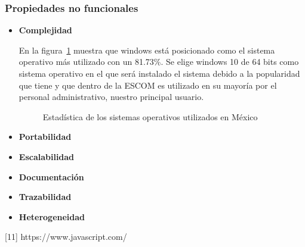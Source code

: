 	\subsubsection{Propiedades no funcionales}
		\begin{itemize}
			\item \textbf{Complejidad}
			
				En la figura~\ref{fig:vistalogica} muestra que windows está posicionado como el sistema operativo más utilizado con un 81.73\%. Se elige windows 10 de 64 bits como sistema operativo en el que será instalado el sistema debido a la popularidad que tiene y que dentro de la ESCOM es utilizado en su mayoría por el personal administrativo, nuestro principal usuario.
				
				\begin{figure}[htbp!]
					\begin{center}
						\caption{Estadística de los sistemas operativos utilizados en México}
						\label{fig:vistalogica}
					\end{center}
				\end{figure}
			
			
			\item \textbf{Portabilidad}
						
			\item \textbf{Escalabilidad}
			
			\item \textbf{Documentación}
			
			\item \textbf{Trazabilidad}
			
			\item \textbf{Heterogeneidad}
		\end{itemize}
	
	
[11]	https://www.javascript.com/